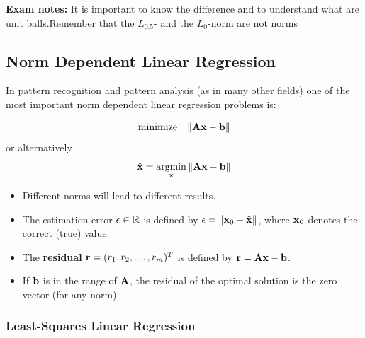  \textbf{Exam notes:} It is important to know the difference and to understand what are unit balls.Remember that the $L_{0.5}$- and the $L_0$-norm are not norms

\subsection{Norm Dependent Linear Regression}

  In pattern recognition and pattern analysis (as in many other fields) one of the most important norm dependent linear regression problems is:

  \begin{displaymath}
   \mbox{minimize}\quad \| \mathbf{A} \bm{\mathrm{x}} -\bm{\mathrm{b}}\|
  \end{displaymath}
  or alternatively
  \begin{displaymath}
   \hat{\bm{\mathrm{x}}} = \operatorname*{argmin}_{\bm{\mathrm{x}}} \| \mathbf{A} \bm{\mathrm{x}} -\bm{\mathrm{b}}\|
  \end{displaymath}
 \begin{itemize}
    \item Different norms will lead to different results. 
    \item The estimation error $\epsilon\in \mathbb{R}$ is defined by $\epsilon= \|\bm{\mathrm{x}}_0-\hat{\bm{\mathrm{x}}}\|$, where $\bm{\mathrm{x}}_0$ denotes the correct (true) value. 
    \item The \textbf{residual} $\bm{\mathrm{r}}= (r_1, r_2, \dots, r_m)^T$ is defined by $\bm{\mathrm{r}}= \mathbf{A} \bm{\mathrm{x}} -\bm{\mathrm{b}}$. \\
    \item If $\bm{\mathrm{b}}$ is in the range of $\mathbf{A}$, the residual of the optimal solution is the zero vector (for any norm).
  \end{itemize}
  
\subsubsection{Least-Squares Linear Regression}


